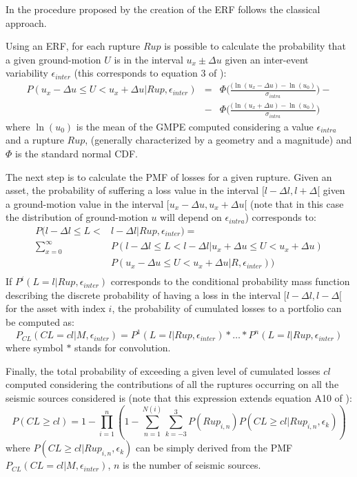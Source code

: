 %
In the procedure proposed by \cite{wesson2009} the creation of the ERF follows the 
classical approach.

Using an ERF, for each rupture $Rup$ is possible to calculate the 
probability that a given ground-motion $U$ is in the interval $u_x\pm \Delta u$ 
given an inter-event variability $\epsilon_{inter}$ (this corresponds to 
equation 3 of \cite{wesson2009}): 
%
\begin{eqnarray}
P(u_x-\Delta u\leq U<u_x+\Delta u|Rup,\epsilon_{inter}) & = &  
	\Phi\bigg(\frac{(\ln (u_x-\Delta u)-\ln(u_0)}{\sigma_{intra}}\bigg) - \nonumber \\
	& - & \Phi\bigg(\frac{(\ln (u_x+\Delta u)-\ln(u_0)}{\sigma_{intra}}\bigg) 
\end{eqnarray}
where $\ln(u_0)$ is the mean of the GMPE computed considering a value 
$\epsilon_{intra}$ and a rupture $Rup$, (generally characterized by a geometry 
and a magnitude) and $\Phi$ is the standard normal CDF. 
  
The next step is to calculate the PMF of losses for a given rupture. Given an asset, 
the probability of suffering a loss value in the interval $[l-\Delta l, l+\Delta[$ 
given a ground-motion value in the interval $[u_x-\Delta u,u_x+\Delta u[$ (note that in this 
case the distribution of ground-motion $u$ will depend on $\epsilon_{intra}$) 
corresponds to:
%
\begin{equation}
\begin{array}{rl}
P(l-\Delta l\leq L < & l-\Delta l|Rup,\epsilon_{inter}) = \\
 	\sum\limits_{x=0}^{\infty}  
	& P(l-\Delta l\leq L < l-\Delta l|u_x+\Delta u\leq U<u_x+\Delta u) \\
	& P(u_x-\Delta u\leq U<u_x+\Delta u|R,\epsilon_{inter})) \\
\end{array}
\end{equation}
%
If $P^i(L=l|Rup,\epsilon_{inter})$ corresponds to the conditional probability mass
function describing the discrete probability of having a loss in the interval 
$[l-\Delta l, l-\Delta[$ for the asset with index $i$, the probability of cumulated 
losses to a portfolio can be computed as:
\begin{equation}
P_{CL}(CL=cl|M,\epsilon_{inter})=P^1(L=l|Rup,\epsilon_{inter})*\ldots*P^n(L=l|Rup,
	\epsilon_{inter})
\end{equation}
where symbol $*$ stands for convolution. 

Finally, the total probability of exceeding a given level of cumulated losses $cl$ 
computed considering the contributions of all the ruptures occurring on all the 
seismic sources considered is (note that this expression extends equation A10 of
\cite{field2003}):  
%
\begin{equation}
P(CL\geq cl)=1-\prod\limits_{i=1}^{n} 
	\left( 
		1-\sum\limits_{n=1}^{N(i)}
		\sum\limits_{k=-3}^{3}
			P(Rup_{i,n})P(CL\geq cl|Rup_{i,n},\epsilon_k)
	\right)
\end{equation}
where $P(CL\geq cl|Rup_{i,n},\epsilon_k)$ can be simply derived from the PMF 
$P_{CL}(CL=cl|M,\epsilon_{inter})$, $n$ is the number of seismic sources.

